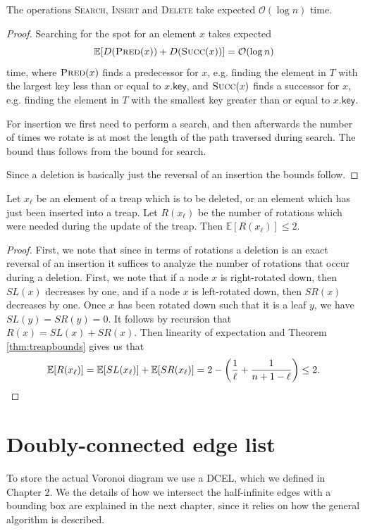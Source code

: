 \begin{lem} \label{lem:treapoperationsbounds}
The operations \textsc{Search}, \textsc{Insert} and \textsc{Delete} take expected $\mathcal{O}(\log n)$ time.
\end{lem}
\begin{proof}
Searching for the spot for an element $x$ takes expected
\[
    \mathbb{E}[D(\textsc{Pred}(x)) + D(\textsc{Succ}(x))] = \mathcal{O}(\log n)
\]
time, where $\textsc{Pred}(x)$ finds a predecessor for $x$, e.g. finding the element in $T$ with the largest key less than or equal to $x\textsf{.key}$, and $\textsc{Succ}(x)$ finds a successor for $x$, e.g. finding the element in $T$ with the smallest key greater than or equal to $x\textsf{.key}$.

For insertion we first need to perform a search, and then afterwards the number of times we rotate is at most the length of the path traversed during search. The bound thus follows from the bound for search.

Since a deletion is basically just the reversal of an insertion the bounds follow.
\end{proof}

\begin{lem} \label{lem:treaprotationbound}
Let $x_{\ell}$ be an element of a treap which is to be deleted, or an element which has just been inserted into a treap. Let $R(x_{\ell})$ be the number of rotations which were needed during the update of the treap. Then $\mathbb{E}[R(x_{\ell})] \leq 2$.
\end{lem}
\begin{proof}
First, we note that since in terms of rotations a deletion is an exact reversal of an insertion it suffices to analyze the number of rotations that occur during a deletion. First, we note that if a node $x$ is right-rotated down, then $SL(x)$ decreases by one, and if a node $x$ is left-rotated down, then $SR(x)$ decreases by one. Once $x$ has been rotated down such that it is a leaf $y$, we have $SL(y) = SR(y) = 0$. It follows by recursion that $R(x) = SL(x) + SR(x)$. Then linearity of expectation and Theorem \ref{thm:treapbounds} gives us that
\[
    \mathbb{E}[R(x_{\ell})] = \mathbb{E}[SL(x_{\ell})] + \mathbb{E}[SR(x_{\ell})] = 2 - \left(\frac{1}{\ell} + \frac{1}{n + 1 - \ell}\right) \leq 2.
\]
\end{proof}

\newpage
\section{Doubly-connected edge list}
To store the actual Voronoi diagram we use a DCEL, which we defined in Chapter 2. We the details of how we intersect the half-infinite edges with a bounding box are explained in the next chapter, since it relies on how the general algorithm is described.

